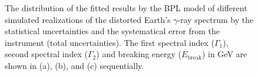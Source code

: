 \begin{figure}[h!]
    \centering
        \caption{
            The distribution of the fitted results by the BPL model
            of different simulated realizations of the distorted Earth’s
            $\gamma$-ray spectrum by the
            statistical uncertainties and the systematical
            error from the instrument (total uncertainties).
            The first spectral index ($\Gamma_1$),
            second spectral index ($\Gamma_2$) and 
            breaking energy ($E_\text{break}$) in GeV
            are shown in (a), (b), and (c) sequentially.
        }
       \label{fig:monte_bpl_tot}
\end{figure}


